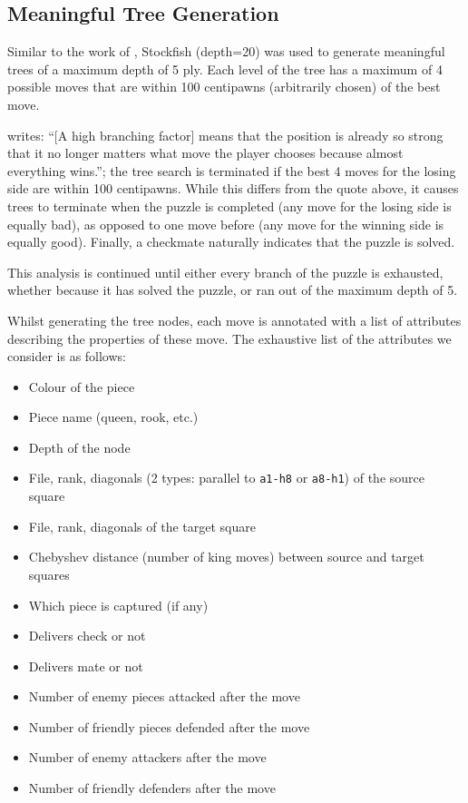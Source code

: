 \subsection{Meaningful Tree Generation}\label{treeS12}

Similar to the work of \citet{chessTrees}, Stockfish (depth=20) was used to
generate meaningful trees of a maximum depth of 5 ply. Each level of the tree
has a maximum of 4 possible moves that are within 100 centipawns (arbitrarily
chosen) of the best move.

\citet{chessTrees} writes: ``[A high branching factor] means that the position
is already so strong that it no longer matters what move the player chooses
because almost everything wins.''; the tree search is terminated if the best 4
moves for the losing side are within 100 centipawns. While this differs from
the quote above, it causes trees to terminate when the puzzle is completed (any
move for the losing side is equally bad), as opposed to one move before (any
move for the winning side is equally good). Finally, a checkmate naturally
indicates that the puzzle is solved. 

This analysis is continued until either every branch of the puzzle is
exhausted, whether because it has solved the puzzle, or ran out of the maximum
depth of 5.

Whilst generating the tree nodes, each move is annotated with a list of
attributes describing the properties of these move. The exhaustive list of the
attributes we consider is as follows:

\begin{itemize}
    \item Colour of the piece
    \item Piece name (queen, rook, etc.\@)
    \item Depth of the node
    \item File, rank, diagonals (2 types: parallel to \texttt{a1-h8} or
        \texttt{a8-h1}) of the source square
    \item File, rank, diagonals of the target square
    \item Chebyshev distance (number of king moves) between source and target
        squares     
    \item Which piece is captured (if any)
    \item Delivers check or not
    \item Delivers mate or not
    \item Number of enemy pieces attacked after the move
    \item Number of friendly pieces defended after the move
    \item Number of enemy attackers after the move
    \item Number of friendly defenders after the move
\end{itemize}

